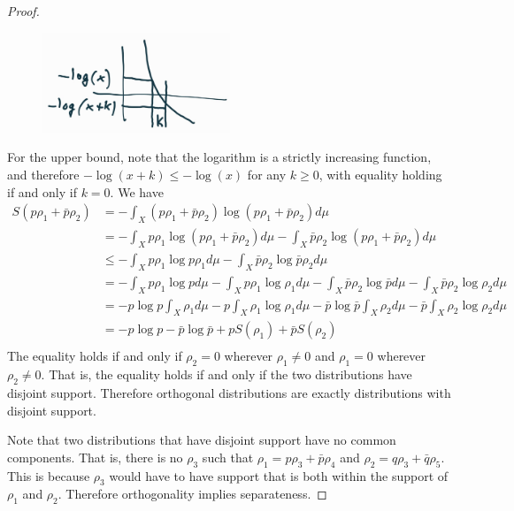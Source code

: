 \begin{proof}
	
\begin{figure}[h]
	\centering
	\includegraphics[width=0.5\textwidth]{tempimages/LogMonotone.jpg}
\end{figure}
	For the upper bound, note that the logarithm is a strictly increasing function, and therefore $- \log(x + k) \leq -\log(x)$ for any $k \geq 0$, with equality holding if and only if $k=0$. We have
	\begin{equation}
		\begin{aligned}
			S(p\rho_1 + \bar{p}\rho_2) &= - \int_X \left(p\rho_1 + \bar{p}\rho_2\right) \log \left(p\rho_1 + \bar{p}\rho_2\right) d\mu \\
			&= - \int_X p\rho_1 \log \left(p\rho_1 + \bar{p}\rho_2\right) d\mu - \int_X \bar{p}\rho_2 \log \left(p\rho_1 + \bar{p}\rho_2\right) d\mu \\
			&\leq  - \int_X p\rho_1 \log p\rho_1 d\mu - \int_X \bar{p}\rho_2 \log \bar{p}\rho_2 d\mu\\
			&=  - \int_X p\rho_1 \log p d\mu - \int_X p\rho_1 \log \rho_1 d\mu - \int_X \bar{p}\rho_2 \log \bar{p} d\mu - \int_X \bar{p}\rho_2 \log \rho_2 d\mu\\
			&=  - p \log p \int_X \rho_1 d\mu - p \int_X \rho_1 \log \rho_1 d\mu - \bar{p} \log \bar{p} \int_X \rho_2 d\mu - \bar{p} \int_X \rho_2 \log \rho_2 d\mu\\
			&=  - p \log p - \bar{p} \log \bar{p} + p S(\rho_1) + \bar{p} S(\rho_2)\\
		\end{aligned}
	\end{equation}
	The equality holds if and only if $\rho_2=0$ wherever $\rho_1\neq0$ and $\rho_1=0$ wherever $\rho_2\neq0$. That is, the equality holds if and only if the two distributions have disjoint support. Therefore orthogonal distributions are exactly distributions with disjoint support.
	
	Note that two distributions that have disjoint support have no common components. That is, there is no $\rho_3$ such that $\rho_1 = p \rho_3 + \bar{p} \rho_4$ and $\rho_2 = q \rho_3 + \bar{q} \rho_5$. This is because $\rho_3$ would have to have support that is both within the support of $\rho_1$ and $\rho_2$. Therefore orthogonality implies separateness.
	

\end{proof}
